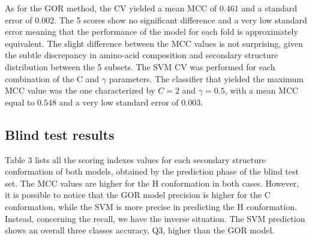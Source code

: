 \documentclass[nocrop]{bioinfo}
\begin{document}
As for the GOR method, the CV yielded a mean MCC of $0.461$ and a standard error of $0.002$. The 5 scores show no significant difference and a very low standard error meaning that the performance of the model for each fold is approximately equivalent. The slight difference between the MCC values is not surprising, given the subtle discrepancy in amino-acid composition and secondary structure distribution between the 5 subsets. 
The SVM CV was performed for each combination of the C and $\gamma$ parameters. The classifier that yielded the maximum MCC value was the one characterized by $C=2$ and $\gamma=0.5$, with a mean MCC equal to $0.548$ and a very low standard error of $0.003$. 

\subsection{Blind test results}  
Table 3 lists all the scoring indexes values for each secondary structure conformation of both models, obtained by the prediction phase of the blind test set. The MCC values are higher for the H conformation in both cases. However, it is possible to notice that the GOR model precision is higher for the C conformation, while the SVM is more precise in predicting the H conformation. Instead, concerning the recall, we have the inverse situation. The SVM prediction shows an overall three classes accuracy, Q3, higher than the GOR model.

\begin{table}[!tbh]
    \centering
    \vspace{+10pt}
    \caption{Blind-test set scores for both the GOR and the SVM models, reported for each secondary structure conformation.}
    \label{Tab:03}
\end{table}
\end{document}
